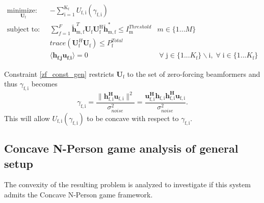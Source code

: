 \documentclass[12pt,a4paper]{report}
\begin{document}
	\begin{subequations}
	\label{optim}
	\begin{align}
	    \underset{\mathbf{U}_{\mathrm{f}} }{\text{minimize: }} \;
	    & - \sum_{\mathrm{i=1}}^{\mathrm{K_f}}
    	U_{\mathrm{f,i}}(\gamma_{\mathrm{f,i}}) \label{player_opt} \\
	    \text{subject to: } \; &
	   \sum^F_{f=1} \mathbf{\tilde{h}}_{\mathrm{m,f}}^T  \mathbf{U_{\mathrm{f}}}		
	\mathbf{U_{\mathrm{f}}^{\mathrm{H}}} \mathbf{\tilde{h}_{\mathrm{m,f}}^*} \leq I^{Threshold}		
	_{\mathrm{m}} & m \in \{1 ...M\} 
		\label{interference_const_gen}\\
        & trace(\mathbf{U}_{\text{f}}^H\mathbf{U}_{\text{f}}) \leq P^{Total}_{\text{f}} \label{power_const_gen}\\
        & \langle \mathbf{h_{\text{f,j}}}\mathbf{u_{\text{f,i}}} \rangle =0\ & \; \forall \; \text{j} \in \{1... K_{\text{f}}\}\backslash \text{i} ,\; \forall \; \text{i} \in \{1 ... K_{\text{f}}\} \label{zf_const_gen}
	\end{align}
	\end{subequations}


Constraint \eqref{zf_const_gen} restricts $\mathbf{U}_{\mathrm{f}}$ to the set of zero-forcing beamformers and thus  
	$\gamma_{\mathrm{f,i}}$ becomes
	\begin{equation}\label{zf_snr}
	\gamma_{\mathrm{f,i}} = \frac{\|\mathbf{h^H_{\mathrm{f,i}}u_{\mathrm{f,i}}}\|^2}
	{\sigma^2_{noise}  
	}
	= 
	\frac{\mathbf{u^H_{\mathrm{f,i}}h_{\mathrm{f,i}}h^H_{\mathrm{f,i}}u_{\mathrm{f,i}}}}
	{\sigma^2_{noise}  
	}.
	\end{equation}
	This will allow $U_{\mathrm{f,i}}(\gamma_{\mathrm{f,i}}) $ to be concave with respect to $\gamma_{\mathrm{f,i}}$.
	
\subsection{Concave N-Person game analysis of general setup}
The convexity of the resulting problem is analyzed to investigate if this system admits the Concave N-Person game framework. 
\end{document}
